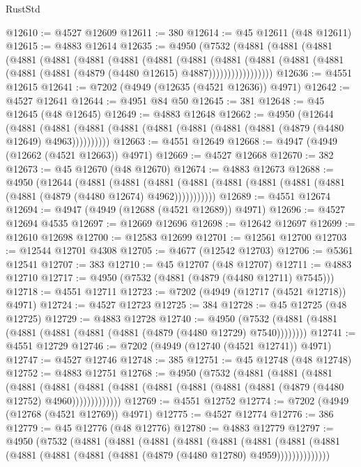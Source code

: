 \begin{lexlean}{RustStd}
\begin{coremodule}
@12610 := @4527 @12609
@12611 := 380
@12614 := @45 @12611 (@48 @12611)
@12615 := @4883 @12614
@12635 := @4950
    (@7532
      (@4881
        (@4881
          (@4881
            (@4881
              (@4881
                (@4881
                  (@4881
                    (@4881
                      (@4881
                        (@4881
                          (@4881
                            (@4881 (@4881 (@4881 (@4881 (@4879 (@4480 @12615) @4887)))))))))))))))))
@12636 := @4551 @12615
@12641 := @7202 (@4949 (@12635 (@4521 @12636)) @4971)
@12642 := @4527 @12641
@12644 := @4951 @84 @50
@12645 := 381
@12648 := @45 @12645 (@48 @12645)
@12649 := @4883 @12648
@12662 := @4950
    (@12644
      (@4881 (@4881 (@4881 (@4881 (@4881 (@4881 (@4881 (@4881 (@4879 (@4480 @12649) @4963))))))))))
@12663 := @4551 @12649
@12668 := @4947 (@4949 (@12662 (@4521 @12663)) @4971)
@12669 := @4527 @12668
@12670 := 382
@12673 := @45 @12670 (@48 @12670)
@12674 := @4883 @12673
@12688 := @4950
    (@12644
      (@4881
        (@4881
          (@4881 (@4881 (@4881 (@4881 (@4881 (@4881 (@4881 (@4879 (@4480 @12674) @4962)))))))))))
@12689 := @4551 @12674
@12694 := @4947 (@4949 (@12688 (@4521 @12689)) @4971)
@12696 := @4527 @12694 @4535
@12697 := @12669 @12696
@12698 := @12642 @12697
@12699 := @12610 @12698
@12700 := @12583 @12699
@12701 := @12561 @12700
@12703 := @12544 @12701 @4308
@12705 := @4677 (@12542 @12703)
@12706 := @5361 @12541
@12707 := 383
@12710 := @45 @12707 (@48 @12707)
@12711 := @4883 @12710
@12717 := @4950 (@7532 (@4881 (@4879 (@4480 @12711) @7545)))
@12718 := @4551 @12711
@12723 := @7202 (@4949 (@12717 (@4521 @12718)) @4971)
@12724 := @4527 @12723
@12725 := 384
@12728 := @45 @12725 (@48 @12725)
@12729 := @4883 @12728
@12740 := @4950 (@7532 (@4881 (@4881 (@4881 (@4881 (@4881 (@4881 (@4879 (@4480 @12729) @7540))))))))
@12741 := @4551 @12729
@12746 := @7202 (@4949 (@12740 (@4521 @12741)) @4971)
@12747 := @4527 @12746
@12748 := 385
@12751 := @45 @12748 (@48 @12748)
@12752 := @4883 @12751
@12768 := @4950
    (@7532
      (@4881
        (@4881
          (@4881
            (@4881
              (@4881
                (@4881 (@4881 (@4881 (@4881 (@4881 (@4881 (@4879 (@4480 @12752) @4960)))))))))))))
@12769 := @4551 @12752
@12774 := @7202 (@4949 (@12768 (@4521 @12769)) @4971)
@12775 := @4527 @12774
@12776 := 386
@12779 := @45 @12776 (@48 @12776)
@12780 := @4883 @12779
@12797 := @4950
    (@7532
      (@4881
        (@4881
          (@4881
            (@4881
              (@4881
                (@4881
                  (@4881
                    (@4881 (@4881 (@4881 (@4881 (@4881 (@4879 (@4480 @12780) @4959))))))))))))))

\end{coremodule}
\end{lexlean}
